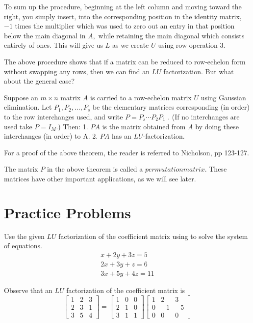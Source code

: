 \documentclass{ximera}
\begin{document}
To sum up the procedure, beginning at the left column and moving toward the right, you
simply insert, into the corresponding position in the identity matrix, $-1$
times the multiplier which was used to zero out an entry in that position
below the main diagonal in $A,$ while retaining the main diagonal which
consists entirely of ones. This will give us $L$ as we create $U$ using row operation 3.

The above procedure shows that if a matrix can be reduced to row-echelon form without swapping any rows, then we can find an $LU$ factorization.  But what about the general case?

\begin{theorem}
Suppose an $m \times n$ matrix $A$ is carried to a row-echelon matrix $U$ using Gaussian elimination. Let $P_1, P_2, \ldots, P_s$ be the elementary matrices corresponding (in order) to the row interchanges used,
and write $P=P_s \cdots P_2 P_1$ . (If no interchanges are used take $P = I_M$.) Then:
1. $PA$ is the matrix obtained from $A$ by doing these interchanges (in order) to A.
2. $PA$ has an $LU$-factorization.
\end{theorem}

For a proof of the above theorem, the reader is referred to Nicholson, pp 123-127.

The matrix $P$ in the above theorem is called a $permutation matrix$.  These matrices have other important applications, as we will see later.


\section*{Practice Problems}

\begin{problem}
Use the given $LU$ factorization of the coefficient matrix using to solve the system of equations.
\begin{equation*}
\begin{array}{c}
x+2y+3z=5 \\
2x+3y+z=6 \\
3x+5y+4z=11
\end{array}
\end{equation*}

Observe that an $LU$ factorization of the coefficient matrix is
\[
\begin{bmatrix}
1 & 2 & 3 \\
2 & 3 & 1 \\
3 & 5 & 4\end{bmatrix}
=
\begin{bmatrix}
1 & 0 & 0 \\
2 & 1 & 0 \\
3 & 1 & 1
\end{bmatrix} 
\begin{bmatrix}
1 & 2 & 3 \\
0 & -1 & -5 \\
0 & 0 & 0
\end{bmatrix}
\]
\end{problem}
\end{document}
